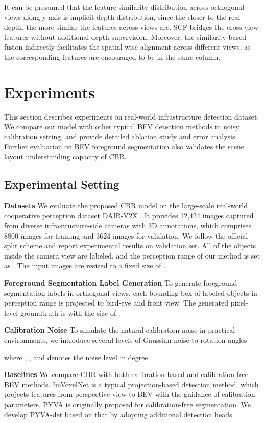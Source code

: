 \documentclass[letterpaper, 10 pt, conference]{ieeeconf}
\begin{document}
It can be presumed that the feature similarity distribution across orthogonal views along y-axis is implicit depth distribution, since the closer to the real depth, the more similar the features across views are. SCF bridges the cross-view features without additional depth supervision. Moreover, the similarity-based fusion indirectly facilitates the spatial-wise alignment across different views, as the corresponding features are encouraged to be in the same  column.

\section{Experiments}
This section describes experiments on real-world infrastructure detection dataset. We compare our model with other typical BEV detection methods in noisy calibration setting, and provide detailed ablation study and error analysis. Further evaluation on BEV foreground segmentation also validates the scene layout understanding capacity of CBR.

\subsection{Experimental Setting}
\textbf{Datasets}
We evaluate the proposed CBR model on the large-scale real-world cooperative perception dataset DAIR-V2X \cite{yu2022dair}. It provides 12,424 images captured from diverse infrastructure-side cameras with 3D annotations, which comprises 8800 images for training and 3624 images for validation. We follow the official split scheme and report experimental results on validation set. All of the objects inside the camera view are labeled, and the perception range of our method is set as . The input images are resized to a fixed size of .

\textbf{Foreground Segmentation Label Generation}
To generate foreground segmentation labels in orthogonal views, each bounding box of labeled objects in perception range is projected to bird-eye and front view. The generated pixel-level groundtruth is with the size of .

\textbf{Calibration Noise}
To simulate the natural calibration noise in practical environments, we introduce several levels of Gaussian noise to rotation angles

where , , and  denotes the noise level in degree.

\textbf{Baselines}
We compare CBR with both calibration-based and calibration-free BEV methods. ImVoxelNet \cite{imvoxelnet} is a typical projection-based detection method, which projects features from perspective view to BEV with the guidance of calibration parameters. PYVA \cite{pyva} is originally proposed for calibration-free segmentation. We develop PYVA-det based on that by adopting additional detection heads.
\end{document}
